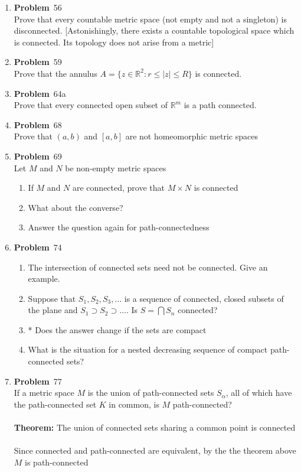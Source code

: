 \documentclass[12pt]{amsart}
\newcommand{\benu}{\begin{enumerate}}
\newcommand{\eenu}{\end{enumerate}}
\theoremstyle{definition}
\newcommand{\mbR}{\mathbb{R}}
\newcommand{\itep}{\item {\bfseries Problem}\ }
\begin{document}
\begin{enumerate}[series=p]
\itep 56\\
Prove that every countable metric space (not empty and not a singleton) is disconnected.  [Astonishingly, there exists a countable topological space which is connected.  Its topology does not arise from a metric]

\newpage
\itep 59\\
Prove that the annulus $A = \{z \in \mbR^2: r \leq |z| \leq R\}$ is connected.

\newpage
\itep 64a\\
Prove that every connected open subset of $\mbR^m$ is a path connected.

\newpage
\itep 68\\
Prove that $(a,b)$ and $[a,b]$ are not homeomorphic metric spaces


\newpage

\itep 69\\
Let $M$ and $N$ be non-empty metric spaces
	\benu
		\item If $M$ and $N$ are connected, prove that $M \times N$ is connected
		\item What about the converse?
		\item Answer the question again for path-connectedness
	\eenu
\newpage


\itep 74\\
	\benu
		\item The intersection of connected sets need not be connected.  Give an example.
		\item Suppose that $S_1, S_2, S_3, \dots$ is a sequence of connected, closed subsets of the plane and $S_1 \supset S_2 \supset \dots$.  Is $S = \bigcap S_n$ connected?
		\item * Does the answer change if the sets are compact
		\item What is the situation for a nested decreasing sequence of compact path-connected sets?
	\eenu
\newpage


\itep 77\\
If a metric space $M$ is the union of path-connected sets $S_\alpha$, all of which have the path-connected set $K$ in common, is $M$ path-connected?\\
\\
\textbf{Theorem:} The union of connected sets sharing a common point is connected
\\\\
Since connected and path-connected are equivalent, by the the theorem above $M$ is path-connected


\end{enumerate}
\end{document}
